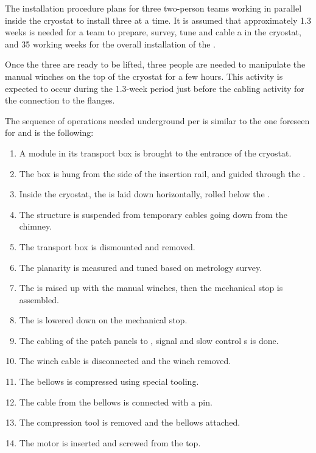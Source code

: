 
The installation procedure %
plans for three two-person teams working in parallel inside the cryostat to %
install three  at a time. It is assumed that %
approximately \num{1.3} weeks is needed for a team to prepare, survey, tune and cable a  in the  cryostat, and \num{35} working weeks for the overall installation of the \dptotcrp {}.

Once the three  are ready to be lifted, three people are needed to manipulate the manual winches on the top of the cryostat for a few hours. This activity is expected to occur during the \num{1.3}-week period just before the cabling activity for the connection to the flanges.



The sequence of operations needed underground per  is similar to the one foreseen for   and is the following: 
\begin{enumerate}
\item A  module in its transport box is brought to the entrance of the cryostat.
\item The box is hung from the side of the insertion rail, and guided through the .
\item  Inside the cryostat, the  is laid down horizontally, rolled below the .
\item The structure is suspended from temporary cables going down from the chimney.
\item The transport box is dismounted and removed.
\item The  planarity is measured and tuned based on metrology survey.
\item The  is raised up with the manual winches, then the mechanical stop is assembled.
\item The  is lowered down  on the mechanical stop.
\item The cabling of the  patch panels to , signal and slow control \fdth{}s is done.
\item The winch cable is disconnected  and the winch removed.
\item The bellows is compressed using special tooling.
\item The cable from the bellows is connected with a pin.
\item The compression tool is removed and the bellows attached.
\item The motor is inserted and screwed from the top.
\end{enumerate}
 

